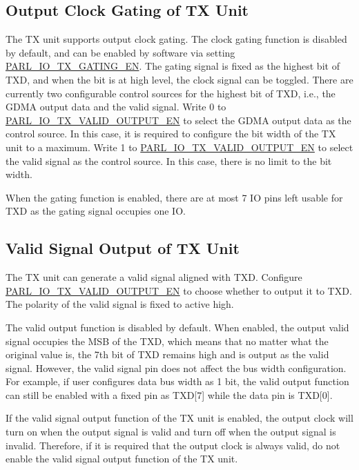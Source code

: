 \documentclass[main\_\_EN.tex]{subfiles}
\begin{document}
{
\subsection{Output Clock Gating of TX Unit}

The TX unit supports output clock gating. The clock gating function is disabled by default, and can be enabled by software via setting \hyperref[fielddesc:PARLIOTXGATINGEN]{PARL\_IO\_TX\_GATING\_EN}. The gating signal is fixed as the highest bit of TXD, and when the bit is at high level, the clock signal can be toggled. There are currently two configurable control sources for the highest bit of TXD, i.e., the GDMA output data and the valid signal. Write 0 to \hyperref[fielddesc:PARLIOTXVALIDOUTPUTEN]{PARL\_IO\_TX\_VALID\_OUTPUT\_EN} to select the GDMA output data as the control source. In this case, it is required to configure the bit width of the TX unit to a maximum. Write 1 to \hyperref[fielddesc:PARLIOTXVALIDOUTPUTEN]{PARL\_IO\_TX\_VALID\_OUTPUT\_EN} to select the valid signal as the control source. In this case, there is no limit to the bit width.

When the gating function is enabled, there are at most 7 IO pins left usable for TXD as the gating signal occupies one IO.

\subsection{Valid Signal Output of TX Unit}

The TX unit can generate a valid signal aligned with TXD. Configure \hyperref[fielddesc:PARLIOTXVALIDOUTPUTEN]{PARL\_IO\_TX\_VALID\_OUTPUT\_EN} to choose whether to output it to TXD. The polarity of the valid signal is fixed to active high.

The valid output function is disabled by default. When enabled, the output valid signal occupies the MSB of the TXD, which means that no matter what the original value is, the 7th bit of TXD remains high and is output as the valid signal. However, the valid signal pin does not affect the bus width configuration. For example, if user configures data bus width as 1 bit, the valid output function can still be enabled with a fixed pin as TXD[7] while the data pin is TXD[0].

\begin{tiplisting}
If the valid signal output function of the TX unit is enabled, the output clock will turn on when the output signal is valid and turn off when the output signal is invalid. Therefore, if it is required that the output clock is always valid, do not enable the valid signal output function of the TX unit.
\end{tiplisting}
}
\end{document}
